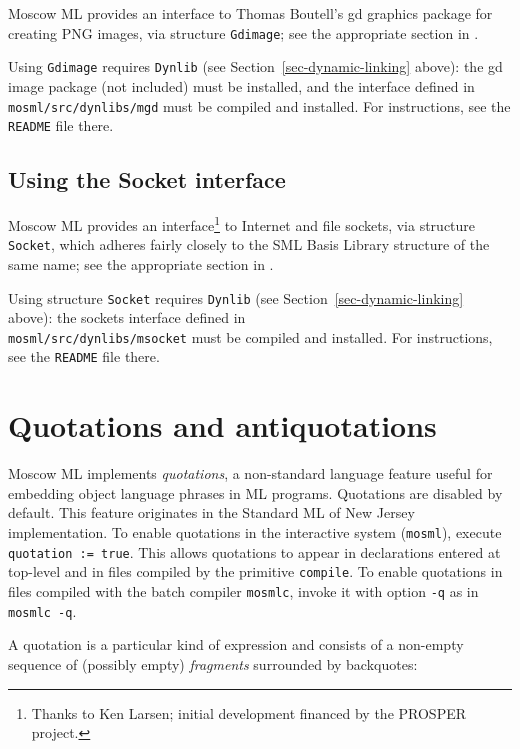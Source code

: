 \documentclass[fleqn]{article}
\begin{document}
Moscow ML provides an interface to Thomas Boutell's gd graphics
package for creating PNG images, via structure {\tt Gdimage}; see the
appropriate section in \cite{MoscowML:2000:MoscowMLLibrary}.

Using \texttt{Gdimage} requires {\tt Dynlib} (see
Section~\ref{sec-dynamic-linking} above): the gd image package (not
included) must be installed, and the interface defined in {\tt
  mosml/src/dynlibs/mgd} must be compiled and installed.  For
instructions, see the {\tt README} file there.


\subsection{Using the Socket interface}
\label{sec-using-msocket}

Moscow ML provides an interface\footnote{Thanks to Ken Larsen; initial
  development financed by the PROSPER project.} to Internet and file
sockets, via structure {\tt Socket}, which adheres fairly closely to
the SML Basis Library structure of the same name; see the
appropriate section in \cite{MoscowML:2000:MoscowMLLibrary}.

Using structure {\tt Socket} requires {\tt Dynlib} (see
Section~\ref{sec-dynamic-linking} above): the sockets interface defined in\\
{\tt mosml/src/dynlibs/msocket} must be compiled and installed.  For
instructions, see the {\tt README} file there.

\newpage
\section{Quotations and antiquotations}
\label{sec-quotations}

Moscow ML implements {\em quotations\/}, a non-standard language
feature useful for embedding object language phrases in ML programs.
Quotations are disabled by default.  This feature originates in the
Standard ML of New Jersey implementation.  To enable quotations in the
interactive system ({\tt mosml}), execute {\tt quotation := true}.
This allows quotations to appear in declarations entered at top-level
and in files compiled by the primitive {\tt compile}.  To enable
quotations in files compiled with the batch compiler {\tt mosmlc},
invoke it with option {\tt -q} as in {\tt mosmlc -q}.

A quotation is a particular kind of expression and consists of a
non-empty sequence of (possibly empty) {\em fragments\/} surrounded by
backquotes:
\end{document}
